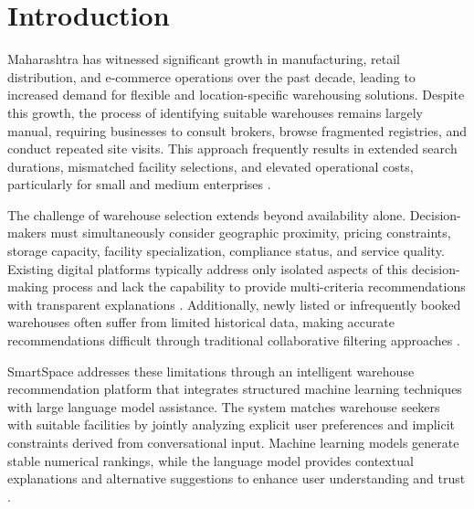 \documentclass[pdflatex,sn-mathphys-num]{sn-jnl}
\theoremstyle{thmstyleone}
\theoremstyle{thmstyletwo}
\theoremstyle{thmstylethree}
\begin{document}
\maketitle


\section{Introduction}\label{sec1}

Maharashtra has witnessed significant growth in manufacturing,
retail distribution, and e-commerce operations over the past decade,
leading to increased demand for flexible and location-specific
warehousing solutions.
Despite this growth, the process of identifying suitable warehouses
remains largely manual, requiring businesses to consult brokers,
browse fragmented registries, and conduct repeated site visits.
This approach frequently results in extended search durations,
mismatched facility selections, and elevated operational costs,
particularly for small and medium enterprises
\cite{b1, b5, b8}.

The challenge of warehouse selection extends beyond availability
alone.
Decision-makers must simultaneously consider geographic proximity,
pricing constraints, storage capacity, facility specialization,
compliance status, and service quality.
Existing digital platforms typically address only isolated aspects
of this decision-making process and lack the capability to provide
multi-criteria recommendations with transparent explanations
\cite{b2}.
Additionally, newly listed or infrequently booked warehouses often
suffer from limited historical data, making accurate recommendations
difficult through traditional collaborative filtering approaches
\cite{b10}.

SmartSpace addresses these limitations through an intelligent
warehouse recommendation platform that integrates structured
machine learning techniques with large language model assistance.
The system matches warehouse seekers with suitable facilities
by jointly analyzing explicit user preferences and implicit
constraints derived from conversational input.
Machine learning models generate stable numerical rankings,
while the language model provides contextual explanations
and alternative suggestions to enhance user understanding
and trust \cite{b3, b7}.
\end{document}

